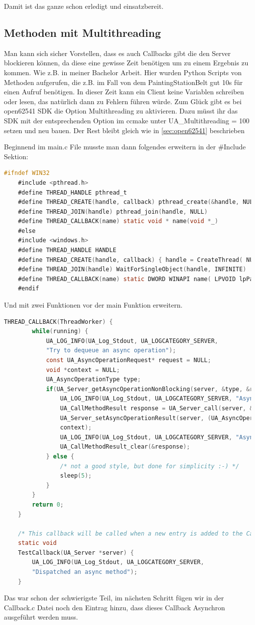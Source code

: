 Damit ist das ganze schon erledigt und einsatzbereit.
\subsection{Methoden mit Multithreading}
Man kann sich sicher Vorstellen, dass es auch Callbacks gibt die den Server blockieren können, da diese eine gewisse Zeit benötigen um zu einem Ergebnis zu kommen.
Wie z.B. in meiner Bachelor Arbeit. Hier wurden Python Scripts von Methoden aufgerufen, die z.B. im Fall von dem PaintingStationBelt gut 10s für einen Aufruf benötigen. In dieser Zeit kann ein Client keine Variablen schreiben oder lesen, das natürlich dann zu Fehlern führen würde. Zum Glück gibt es bei open62541 SDK die Option Multithreading zu aktivieren. Dazu müsst ihr das SDK mit der entsprechenden Option im ccmake unter UA\_Multithreading = 100 setzen und neu bauen.  Der Rest bleibt gleich wie in \autoref{sec:open62541} beschrieben

Beginnend im main.c File musste man dann folgendes erweitern in der \#Include Sektion:
\begin{lstlisting}[language=C]
	#ifndef WIN32
	#include <pthread.h>
	#define THREAD_HANDLE pthread_t
	#define THREAD_CREATE(handle, callback) pthread_create(&handle, NULL, callback, NULL)
	#define THREAD_JOIN(handle) pthread_join(handle, NULL)
	#define THREAD_CALLBACK(name) static void * name(void *_)
	#else
	#include <windows.h>
	#define THREAD_HANDLE HANDLE
	#define THREAD_CREATE(handle, callback) { handle = CreateThread( NULL, 0, callback, NULL, 0, NULL); }
	#define THREAD_JOIN(handle) WaitForSingleObject(handle, INFINITE)
	#define THREAD_CALLBACK(name) static DWORD WINAPI name( LPVOID lpParam )
	#endif
\end{lstlisting}
Und mit zwei Funktionen vor der main Funktion erweitern.

\begin{lstlisting}[language=C]
	THREAD_CALLBACK(ThreadWorker) {
		while(running) {
			UA_LOG_INFO(UA_Log_Stdout, UA_LOGCATEGORY_SERVER,
			"Try to dequeue an async operation");
			const UA_AsyncOperationRequest* request = NULL;
			void *context = NULL;
			UA_AsyncOperationType type;
			if(UA_Server_getAsyncOperationNonBlocking(server, &type, &request, &context, NULL) == true) {
				UA_LOG_INFO(UA_Log_Stdout, UA_LOGCATEGORY_SERVER, "AsyncMethod_Testing: Got entry: OKAY");
				UA_CallMethodResult response = UA_Server_call(server, &request->callMethodRequest);
				UA_Server_setAsyncOperationResult(server, (UA_AsyncOperationResponse*)&response,
				context);
				UA_LOG_INFO(UA_Log_Stdout, UA_LOGCATEGORY_SERVER, "AsyncMethod_Testing: Call done: OKAY");
				UA_CallMethodResult_clear(&response);
			} else {
				/* not a good style, but done for simplicity :-) */
				sleep(5);
			}
		}
		return 0;
	}
	
	/* This callback will be called when a new entry is added to the Callrequest queue */
	static void
	TestCallback(UA_Server *server) {
		UA_LOG_INFO(UA_Log_Stdout, UA_LOGCATEGORY_SERVER,
		"Dispatched an async method");
	}
\end{lstlisting}
Das war schon der schwierigste Teil, im nächsten Schritt fügen wir in der Callback.c Datei noch den Eintrag hinzu, dass dieses Callback Asynchron ausgeführt werden muss.

